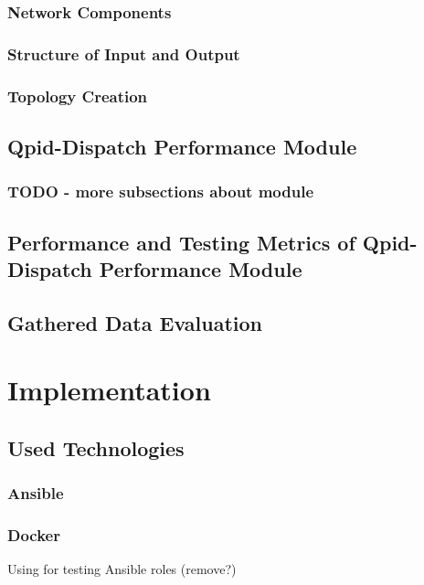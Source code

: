 \subsection{Network Components}

\subsection{Structure of Input and Output}

\subsection{Topology Creation}

\section{Qpid-Dispatch Performance Module}

\subsection{TODO - more subsections about module}

\section{Performance and Testing Metrics of Qpid-Dispatch Performance Module}

\section{Gathered Data Evaluation}

\chapter{Implementation}
\label{Implementation}

\section{Used Technologies}

\subsection{Ansible}

\subsection{Docker}
Using for testing Ansible roles (remove?)

